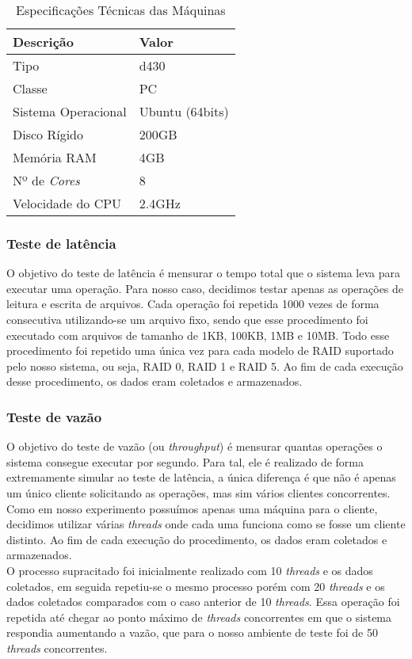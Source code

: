 	\capstartfalse
	\begin{table} [htb]
		\caption{Especificações Técnicas das Máquinas}
		\centering
		\begin{tabular}{|l|l|} \hline
			\textbf{Descrição} 	& \textbf{Valor} \\ \hline
			
			Tipo				& d430\\ \hline
			Classe				& PC\\ \hline
			Sistema Operacional & Ubuntu (64bits)\\ \hline
			Disco Rígido		& 200GB \\ \hline
			Memória RAM			& 4GB \\ \hline
			Nº de \textit{Cores}& 8 \\ \hline
			Velocidade do CPU	& 2.4GHz  \\ \hline
						
		\end{tabular}
		\label{tab:exp_vm}
	\end{table}
	\capstarttrue
	

	\subsubsection{Teste de latência}
	O objetivo do teste de latência é mensurar o tempo total que o sistema leva para executar uma operação. Para nosso caso, decidimos testar apenas as operações de leitura e escrita de arquivos. Cada operação foi repetida 1000 vezes de forma consecutiva utilizando-se um arquivo fixo, sendo que esse procedimento foi executado com arquivos de tamanho de 1KB, 100KB, 1MB e 10MB. Todo esse procedimento foi repetido uma única vez para cada modelo de RAID suportado pelo nosso sistema, ou seja, RAID 0, RAID 1 e RAID 5. Ao fim de cada execução desse procedimento, os dados eram coletados e armazenados.
	\\
	
	\subsubsection{Teste de vazão}	
	O objetivo do teste de vazão (ou \textit{throughput}) é mensurar quantas operações o sistema consegue executar por segundo. Para tal, ele é realizado de forma extremamente simular ao teste de latência, a única diferença é que não é apenas um único cliente solicitando as operações, mas sim vários clientes concorrentes. Como em nosso experimento possuímos apenas uma máquina para o cliente, decidimos utilizar várias \textit{threads} onde cada uma funciona como se fosse um cliente distinto. Ao fim de cada execução do procedimento, os dados eram coletados e armazenados.
	\\
	
	O processo supracitado foi inicialmente realizado com 10 \textit{threads} e os dados coletados, em seguida repetiu-se o mesmo processo porém com 20 \textit{threads} e os dados coletados comparados com o caso anterior de 10 \textit{threads}. Essa operação foi repetida até chegar ao ponto máximo de \textit{threads} concorrentes em que o sistema respondia aumentando a vazão, que para o nosso ambiente de teste foi de 50 \textit{threads} concorrentes.
	\\